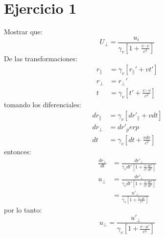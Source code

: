 \section*{Ejercicio 1}
Mostrar que:
\begin{equation*}
    U_\perp=\frac{u_i}{\gamma_v \left[1+\frac{\upsilon \cdot v}{c^2} \right]}
\end{equation*}
De las transformaciones:
\begin{align*}
    r_\parallel &= \gamma_v [{r_\parallel}'+v{t}']\\
    r_\perp &= {r_\perp}'\\
    t&= \gamma_v \left[ {t}'+\frac{\upsilon \cdot v}{c^2}\right]
\end{align*}
tomando los diferenciales:
\begin{align*}
    dr_\parallel &= \gamma_v \left[{dr}'_\parallel + vdt\right]\\
    dr_\perp &= {dr}'_perp\\
    dt&=\gamma_v \left[dt+ \frac{vdr}{c^2} \right]
\end{align*}
entonces:
\begin{align*}
    \frac{dr_\perp}{dt}&= \frac{{dr}'_\perp}{\gamma_v {dt}'\left[1+\frac{v}{c^2} \frac{{dr}'}{{dt}'} \right]}\\
    u_\perp&= \frac{{dr}'_\perp}{\gamma_v {dt}' \left[1+\frac{v}{c^2}\frac{{dr}'}{{dt}'} \right]}\\
    & = \frac{{u}'_\perp}{\gamma_v \left[1+\frac{v\cdot {u}'}{c^2} \right]}
\end{align*}
por lo tanto:
\begin{equation}
    u_\perp = \frac{{u}'_\perp}{\gamma_v \left[1+\frac{v\cdot {u}'}{c^2} \right]}
\end{equation}